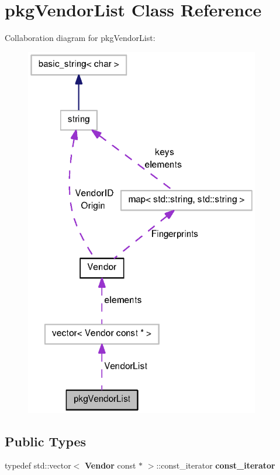 \section{pkg\-Vendor\-List \-Class \-Reference}
\label{classpkgVendorList}


\-Collaboration diagram for pkg\-Vendor\-List\-:
\nopagebreak
\begin{figure}[H]
\begin{center}
\leavevmode
\includegraphics[width=291pt]{classpkgVendorList__coll__graph}
\end{center}
\end{figure}
\subsection*{\-Public \-Types}
\begin{DoxyCompactItemize}
\item 
typedef std\-::vector$<$ {\bf \-Vendor} \*
const $\ast$ $>$\-::const\-\_\-iterator {\bfseries const\-\_\-iterator}\label{classpkgVendorList_ad4dcf4232ddfecd0991c68d7234e0e28}

\end{DoxyCompactItemize}
